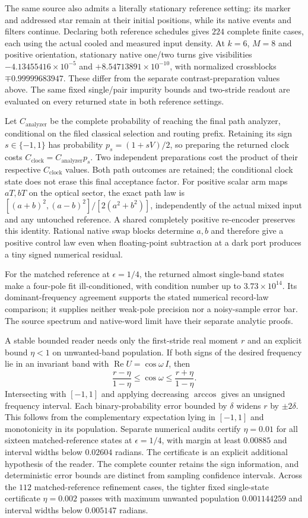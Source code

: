 The same source also admits a literally stationary reference setting: its
marker and addressed star remain at their initial positions, while its
native events and filters continue. Declaring both reference schedules gives
$224$ complete finite cases, each using the actual cooled and measured input
density. At $k=6$, $M=8$ and positive orientation, stationary native one/two
turns give visibilities $-4.13455416\times10^{-5}$ and
$+8.54713891\times10^{-10}$, with normalized crossblocks
$\mp0.99999683947$. These differ from the separate contrast-preparation
values above. The same fixed single/pair impurity bounds and two-stride
readout are evaluated on every returned state in both reference settings.

Let $C_{\mathrm{analyzer}}$ be the complete probability of reaching the final
path analyzer, conditional on the filed classical selection and routing
prefix. Retaining its sign $s\in\{-1,1\}$ has probability
$p_s=(1+sV)/2$, so preparing the returned clock costs
$C_{\mathrm{clock}}=C_{\mathrm{analyzer}}p_s$. Two independent preparations
cost the product of their respective $C_{\mathrm{clock}}$ values. Both path
outcomes are retained; the conditional clock state does not erase this final
acceptance factor.
For positive scalar arm maps $aT,bT$ on the optical sector, the exact path
law is $[(a+b)^2,(a-b)^2]/[2(a^2+b^2)]$, independently of the actual mixed
input and any untouched reference. A shared completely positive re-encoder
preserves this identity. Rational native swap blocks determine $a,b$ and
therefore give a positive control law even when floating-point subtraction
at a dark port produces a tiny signed numerical residual.

For the matched reference at $\epsilon=1/4$, the returned almost single-band states make a four-pole
fit ill-conditioned, with condition number up to $3.73\times10^{14}$. Its dominant-frequency
agreement supports the stated numerical record-law comparison; it supplies
neither weak-pole precision nor a noisy-sample error bar. The source spectrum
and native-word limit have their separate analytic proofs.

A stable bounded reader needs only the first-stride real moment $r$ and an
explicit bound $\eta<1$ on unwanted-band population. If both signs of the
desired frequency lie in an invariant band with
$\operatorname{Re}U=\cos\omega\,I$, then
\[
 \frac{r-\eta}{1-\eta}\leq\cos\omega
 \leq\frac{r+\eta}{1-\eta}.
\]
Intersecting with $[-1,1]$ and applying decreasing $\arccos$ gives an
unsigned frequency interval. Each binary-probability error bounded by $\delta$
widens $r$ by $\pm2\delta$. This follows from the complementary expectation
lying in $[-1,1]$ and monotonicity in its population. Separate numerical audits
certify $\eta=0.01$ for all sixteen matched-reference states at $\epsilon=1/4$, with margin at least
$0.00885$ and interval widths below $0.02604$ radians. The certificate is an
explicit additional hypothesis of the reader. The complete counter retains
the sign information, and deterministic error bounds are distinct from
sampling confidence intervals. Across the $112$ matched-reference refinement cases, the tighter
fixed single-state certificate $\eta=0.002$ passes with maximum unwanted
population $0.001144259$ and interval widths below $0.005147$ radians.


